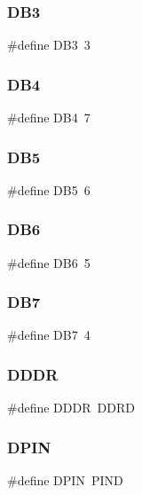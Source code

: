 \mbox{\label{lcd_8h_a765256cd986c073fd4521f361d53859a}} 
\subsubsection{D\+B3}
{\footnotesize\ttfamily \#define D\+B3~3}

\mbox{\label{lcd_8h_acdecad1b5b1abdca1ba50a47addef513}} 
\subsubsection{D\+B4}
{\footnotesize\ttfamily \#define D\+B4~7}

\mbox{\label{lcd_8h_ac0f7c08c3e95bbb41632e415e6b3f001}} 
\subsubsection{D\+B5}
{\footnotesize\ttfamily \#define D\+B5~6}

\mbox{\label{lcd_8h_ad9cc200e9e406247bd374e44947f2aec}} 
\subsubsection{D\+B6}
{\footnotesize\ttfamily \#define D\+B6~5}

\mbox{\label{lcd_8h_acf475e70fa2ffe31079a07ba7ae18116}} 
\subsubsection{D\+B7}
{\footnotesize\ttfamily \#define D\+B7~4}

\mbox{\label{lcd_8h_a2fcf003134dc590da4aa010aa86bd849}} 
\subsubsection{D\+D\+DR}
{\footnotesize\ttfamily \#define D\+D\+DR~D\+D\+RD}

\mbox{\label{lcd_8h_a071a389dc63a2a45fe3051e3beae10d3}} 
\subsubsection{D\+P\+IN}
{\footnotesize\ttfamily \#define D\+P\+IN~P\+I\+ND}

